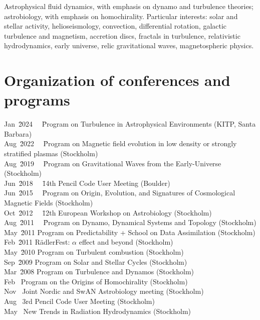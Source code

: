 \documentclass{article}
\begin{document}
Astrophysical fluid dynamics, 
with emphasis on dynamo and turbulence theories;
astrobiology, with emphasis on homochirality.
Particular interests: solar and stellar activity, helioseismology,
convection, differential rotation, galactic turbulence and magnetism,
accretion discs, fractals in turbulence, relativistic hydrodynamics,
early universe, relic gravitational waves, magnetospheric physics.
\\

\section*{Organization of conferences and programs}

\begin{tabbing}
Jan~\= 2024 ~~\= Program on Turbulence in Astrophysical Environments (KITP, Santa Barbara) \\
Aug~\= 2022 ~~\= Program on Magnetic field evolution in low density or strongly stratified plasmas (Stockholm) \\
Aug~\= 2019 ~~\= Program on Gravitational Waves from the Early-Universe (Stockholm) \\
Jun~\= 2018 ~~\= 14th Pencil Code User Meeting (Boulder) \\
Jun~\= 2015 ~~\= Program on Origin, Evolution, and Signatures of Cosmological Magnetic Fields (Stockholm)\\
Oct~\= 2012 ~~\= 12th European Workshop on Astrobiology (Stockholm)\\
Aug~\= 2011 ~~\= Program on Dynamo, Dynamical Systems and Topology (Stockholm)\\
May~\= 2011   \> Program on Predictability + School on Data Assimilation (Stockholm) \\
Feb~\= 2011   \> R\"adlerFest: $\alpha$ effect and beyond (Stockholm) \\
May~\= 2010   \> Program on Turbulent combustion (Stockholm) \\
Sep~\= 2009   \> Program on Solar and Stellar Cycles (Stockholm) \\
Mar~\= 2008   \> Program on Turbulence and Dynamos (Stockholm) \\
Feb~   \> Program on the Origins of Homochirality (Stockholm) \\
Nov~   \> Joint Nordic and SwAN Astrobiology meeting (Stockholm) \\
Aug~   \> 3rd Pencil Code User Meeting (Stockholm) \\
May~   \> New Trends in Radiation Hydrodynamics (Stockholm) \\

\end{tabbing}
\end{document}
